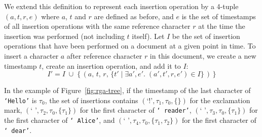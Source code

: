 \documentclass[sigconf]{acmart}
\begin{document}
We extend this definition to represent each insertion operation by a 4-tuple $(a, t, r, e)$ where $a$, $t$ and $r$ are defined as before, and $e$ is the set of timestamps of all insertion operations with the same reference character $r$ at the time the insertion was performed (not including $t$ itself).
Let $I$ be the set of insertion operations that have been performed on a document at a given point in time.
To insert a character $a$ after reference character $r$ in this document, we create a new timestamp $t$, create an insertion operation, and add it to $I$:
\[ I' = I \;\cup\; \big\{\,(a,\, t,\, r,\, \{t' \mid \exists a', e'.\; (a', t', r, e') \in I \}\,)\,\big\} \]

In the example of Figure~\ref{fig:rga-tree}, if the timestamp of the last character of \texttt{`Hello'} is $\tau_0$, the set of insertions contains $(\texttt{`!'}, \tau_1, \tau_0, \{\})$ for the exclamation mark, $(\texttt{`~'}, \tau_2, \tau_0, \{\tau_1\})$ for the first character of \texttt{`~reader'}, $(\texttt{`~'}, \tau_3, \tau_0, \{\tau_1\})$ for the first character of \texttt{`~Alice'}, and $(\texttt{`~'}, \tau_4, \tau_0, \{\tau_1, \tau_2\})$ for the first character of \texttt{`~dear'}.
\end{document}

